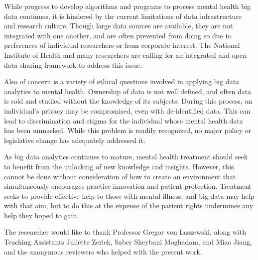 \documentclass[sigconf]{acmart}
\begin{document}
While progress to develop algorithms and programs to process mental health big data continues, it is hindered by the current limitations of data infrastructure and research culture. Though large data sources are available, they are not integrated with one another, and are often prevented from doing so due to preferences of individual researchers or from corporate interest. The National Institute of Health and many researchers are calling for an integrated and open data sharing framework to address this issue.

Also of concern is a variety of ethical questions involved in applying big data analytics to mental health. Ownership of data is not well defined, and often data is sold and studied without the knowledge of its subjects. During this process, an individual's privacy may be compromised, even with de-identified data. This can lead to discrimination and stigma for the individual whose mental health data has been unmasked. While this problem is readily recognized, no major policy or legislative change has adequately addressed it. 

As big data analytics continues to mature, mental health treatment should seek to benefit from the unlocking of new knowledge and insights. However, this cannot be done without consideration of how to create an environment that simultaneously encourages practice innovation and patient protection. Treatment seeks to provide effective help to those with mental illness, and big data may help with that aim, but to do this at the expense of the patient rights undermines any help they hoped to gain.



\begin{acks}

The researcher would like to thank Professor Gregor von Laszewski, along with Teaching Assistants Juliette Zerick, Saber Sheybani Moghadam, and Miao Jiang, and the anonymous reviewers who helped with the present work.

\end{acks}


 
\end{document}
